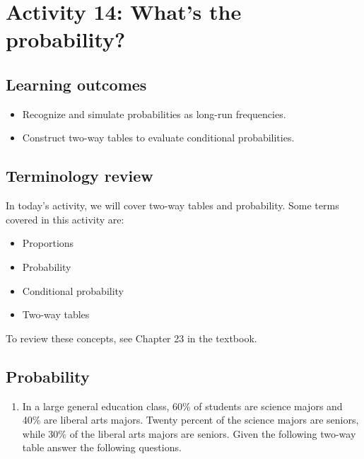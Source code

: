 \documentclass[
]{report}
\providecommand{\tightlist}{%
  \setlength{\itemsep}{0pt}\setlength{\parskip}{0pt}}
\begin{document}
\newpage

\hypertarget{activity-14-whats-the-probability}{%
\section{Activity 14: What's the probability?}\label{activity-14-whats-the-probability}}


\hypertarget{learning-outcomes-12}{%
\subsection{Learning outcomes}\label{learning-outcomes-12}}

\begin{itemize}
\item
  Recognize and simulate probabilities as long-run frequencies.
\item
  Construct two-way tables to evaluate conditional probabilities.
\end{itemize}

\hypertarget{terminology-review-9}{%
\subsection{Terminology review}\label{terminology-review-9}}

In today's activity, we will cover two-way tables and probability. Some terms covered in this activity are:

\begin{itemize}
\item
  Proportions
\item
  Probability
\item
  Conditional probability
\item
  Two-way tables
\end{itemize}

To review these concepts, see Chapter 23 in the textbook.

\hypertarget{probability-1}{%
\subsection{Probability}\label{probability-1}}

\begin{enumerate}
\def\labelenumi{\arabic{enumi}.}
\tightlist
\item
  In a large general education class, 60\% of students are science majors and 40\% are liberal arts majors. Twenty percent of the science majors are seniors, while 30\% of the liberal arts majors are seniors. Given the following two-way table answer the following questions.
\end{enumerate}
\end{document}

